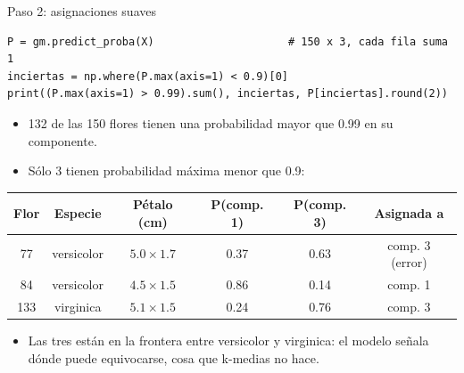 \begin{frame}[fragile]{Paso 2: asignaciones suaves}
\begin{lstlisting}
P = gm.predict_proba(X)                     # 150 x 3, cada fila suma 1
inciertas = np.where(P.max(axis=1) < 0.9)[0]
print((P.max(axis=1) > 0.99).sum(), inciertas, P[inciertas].round(2))
\end{lstlisting}
  \small
  \begin{itemize}
    \item 132 de las 150 flores tienen una probabilidad mayor que 0.99 en su componente.
    \item Sólo 3 tienen probabilidad máxima menor que 0.9:
  \end{itemize}
  \centering
  \begin{tabular}{@{}cccccc@{}}
    \toprule
    \textbf{Flor} & \textbf{Especie} & \textbf{Pétalo (cm)} & \textbf{P(comp. 1)} & \textbf{P(comp. 3)} & \textbf{Asignada a}\\
    \midrule
    77  & versicolor & $5.0 \times 1.7$ & 0.37 & 0.63 & comp. 3 (error) \\
    84  & versicolor & $4.5 \times 1.5$ & 0.86 & 0.14 & comp. 1 \\
    133 & virginica  & $5.1 \times 1.5$ & 0.24 & 0.76 & comp. 3 \\
    \bottomrule
  \end{tabular}
  \begin{itemize}
    \item Las tres están en la frontera entre versicolor y virginica: el modelo
          señala dónde puede equivocarse, cosa que k-medias no hace.
  \end{itemize}
\end{frame}


